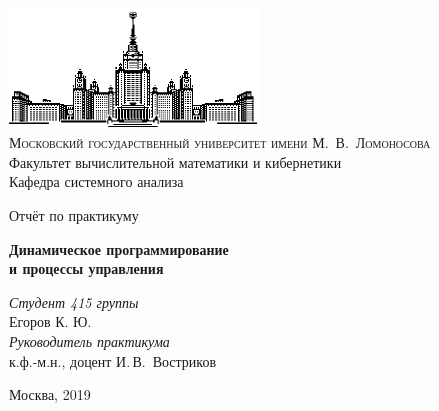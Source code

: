 \thispagestyle{empty}
\begin{center}
    \ \vspace{-3cm}

    \includegraphics[width=0.5\textwidth]{title_page/msu.eps}\\

    {\small{\scshape  Московский государственный университет имени М.~В.~Ломоносова}\\
    Факультет вычислительной математики и кибернетики\\
    Кафедра системного анализа}

    \vfill

    {\Large Отчёт по практикуму}

    \vspace{1cm}

    {\LARGE\bfseries Динамическое программирование\\ и процессы управления}
\end{center}

\vspace{3cm}

\begin{flushright}
    \large
    \textit{Студент 415 группы}\\
    Егоров К. Ю.\\
    \textit{Руководитель практикума}\\
    к.ф.-м.н., доцент И.\,В.~Востриков
\end{flushright}

\vfill

\begin{center}
    Москва, 2019
\end{center}

\clearpage